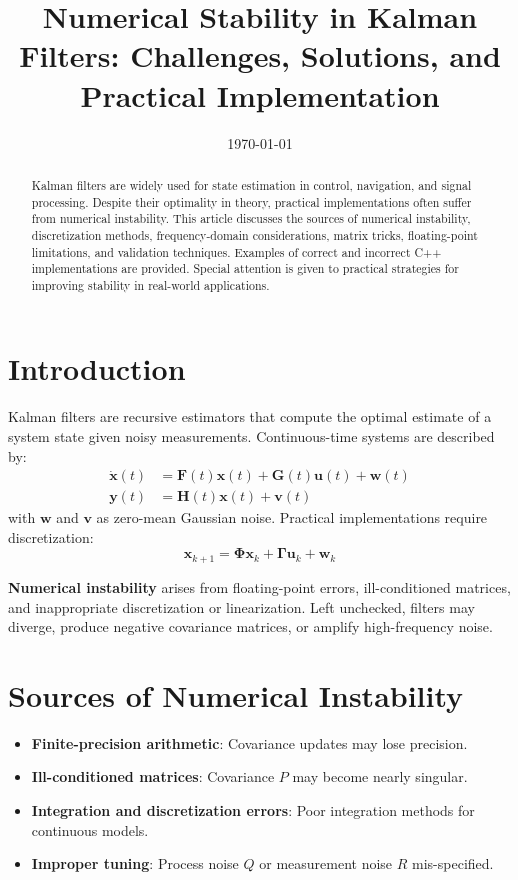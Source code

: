 \documentclass[11pt]{article}
\title{Numerical Stability in Kalman Filters: Challenges, Solutions, and Practical Implementation}
\author{}
\date{\today}
\begin{document}
\maketitle

\begin{abstract}
Kalman filters are widely used for state estimation in control, navigation, and signal processing. Despite their optimality in theory, practical implementations often suffer from numerical instability. This article discusses the sources of numerical instability, discretization methods, frequency-domain considerations, matrix tricks, floating-point limitations, and validation techniques. Examples of correct and incorrect C++ implementations are provided. Special attention is given to practical strategies for improving stability in real-world applications.
\end{abstract}

\tableofcontents
\newpage

\section{Introduction}
Kalman filters are recursive estimators that compute the optimal estimate of a system state given noisy measurements. Continuous-time systems are described by:
\begin{align}
\dot{\bm{x}}(t) &= \bm{F}(t) \bm{x}(t) + \bm{G}(t) \bm{u}(t) + \bm{w}(t) \\
\bm{y}(t) &= \bm{H}(t) \bm{x}(t) + \bm{v}(t)
\end{align}
with $\bm{w}$ and $\bm{v}$ as zero-mean Gaussian noise. Practical implementations require discretization:
\[
\bm{x}_{k+1} = \bm{\Phi} \bm{x}_k + \bm{\Gamma} \bm{u}_k + \bm{w}_k
\]

\textbf{Numerical instability} arises from floating-point errors, ill-conditioned matrices, and inappropriate discretization or linearization. Left unchecked, filters may diverge, produce negative covariance matrices, or amplify high-frequency noise.

\section{Sources of Numerical Instability}
\begin{itemize}
    \item \textbf{Finite-precision arithmetic}: Covariance updates may lose precision.
    \item \textbf{Ill-conditioned matrices}: Covariance $P$ may become nearly singular.
    \item \textbf{Integration and discretization errors}: Poor integration methods for continuous models.
    \item \textbf{Improper tuning}: Process noise $Q$ or measurement noise $R$ mis-specified.
\end{itemize}
\end{document}
